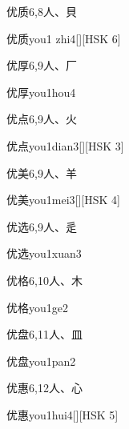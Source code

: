 \begin{Entry}{优质}{6,8}{⼈、⾙}
  \begin{Phonetics}{优质}{you1 zhi4}[][HSK 6]
  \end{Phonetics}
\end{Entry}

\begin{Entry}{优厚}{6,9}{⼈、⼚}
  \begin{Phonetics}{优厚}{you1hou4}
  \end{Phonetics}
\end{Entry}

\begin{Entry}{优点}{6,9}{⼈、⽕}
  \begin{Phonetics}{优点}{you1dian3}[][HSK 3]
  \end{Phonetics}
\end{Entry}

\begin{Entry}{优美}{6,9}{⼈、⽺}
  \begin{Phonetics}{优美}{you1mei3}[][HSK 4]
  \end{Phonetics}
\end{Entry}

\begin{Entry}{优选}{6,9}{⼈、⾡}
  \begin{Phonetics}{优选}{you1xuan3}
  \end{Phonetics}
\end{Entry}

\begin{Entry}{优格}{6,10}{⼈、⽊}
  \begin{Phonetics}{优格}{you1ge2}
  \end{Phonetics}
\end{Entry}

\begin{Entry}{优盘}{6,11}{⼈、⽫}
  \begin{Phonetics}{优盘}{you1pan2}
  \end{Phonetics}
\end{Entry}

\begin{Entry}{优惠}{6,12}{⼈、⼼}
  \begin{Phonetics}{优惠}{you1hui4}[][HSK 5]
  \end{Phonetics}
\end{Entry}

